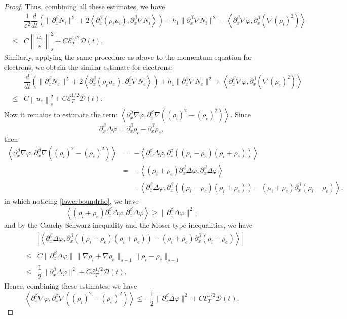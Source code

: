 \documentclass[reqno,twoside,12pt,a4paper]{amsart}
\newcommand{\eps}{\mathbb{\varepsilon}}
\newcommand{\pa}{\partial}
\newcommand{\D}{\nabla}
\newcommand{\vp}{\varphi}
\newcommand{\cubic}{C\mathscr{E}_T^{1/2}\mathscr{D}(t)}
\numberwithin{equation}{section}
\begin{document}
\begin{proof}
Thus, combining all these estimates, we have
\begin{eqnarray}\label{idiss}
&\,& \dfrac{1}{\eps^2}\dfrac{d}{dt}\left( \|\pa_x^\beta N_i\|^2+2\left<\pa_x^\beta (\rho_i u_i), \pa_x^\beta \nabla N_i \right>\right)+ h_1\|\pa_x^\beta\nabla N_i\|^2-\left<\pa_x^\beta \D\vp, \pa_x^\beta(\nabla (\rho_i)^2)\right>\nonumber\\
&\leq& C\left\|\dfrac{u_i}{\eps}\right\|_s^2+\cubic.
\end{eqnarray}
Similarly, applying the same procedure as above to the momentum equation for electrons, we obtain the similar estimate for electrons:
\begin{eqnarray}\label{ediss}
&\,& \dfrac{d}{dt}\left( \|\pa_x^\beta N_e\|^2+2\left<\pa_x^\beta (\rho_e u_e), \pa_x^\beta \nabla N_e \right>\right)+ h_1\|\pa_x^\beta\nabla N_e\|^2+\left<\pa_x^\beta \D\vp, \pa_x^\beta(\nabla (\rho_e)^2)\right>\nonumber\\
&\leq& C\left\|{u}_e\right\|_s^2+C\mathscr{E}_T^{1/2}\mathscr{D}(t).
\end{eqnarray}
Now it remains to estimate the term $\left<\pa_x^\beta \D\vp, \pa_x^\beta \nabla ((\rho_i)^2-(\rho_e)^2)\right>$. Since
\[
\pa_x^\beta \Delta \vp= \pa_x^\beta \rho_i-\pa_x^\beta \rho_e,
\]
then
\begin{eqnarray*}
\left<\pa_x^\beta \D\vp, \pa_x^\beta \nabla ((\rho_i)^2-(\rho_e)^2)\right>
&=&-\left<\pa_x^\beta \Delta \vp, \pa_x^\beta ((\rho_i-\rho_e)(\rho_i+\rho_e))\right>\nonumber\\
&=&-\left<(\rho_i+\rho_e)\pa_x^\beta \Delta \vp, \pa_x^\beta \Delta \vp\right>\nonumber\\
&\,&-\left<\pa_x^\beta \Delta \vp, \pa_x^\beta ((\rho_i-\rho_e)(\rho_i+\rho_e))-(\rho_i+\rho_e)\pa_x^\beta(\rho_i-\rho_e)\right>,
\end{eqnarray*}
in which noticing \eqref{lowerboundrho}, we have
\[
\left<(\rho_i+\rho_e)\pa_x^\beta \Delta \vp, \pa_x^\beta \Delta \vp\right>\geq \|\pa_x^\beta \Delta \vp \|^2,
\]
and by the Cauchy-Schwarz inequality and the Moser-type inequalities, we have
\begin{eqnarray*}
&\,&|\left<\pa_x^\beta \Delta \vp, \pa_x^\beta ((\rho_i-\rho_e)(\rho_i+\rho_e))-(\rho_i+\rho_e)\pa_x^\beta(\rho_i-\rho_e)\right>|\nonumber\\
&\leq& C\|\pa_x^\beta \Delta \vp\|\|\nabla \rho_i+\nabla \rho_e\|_{s-1} \|\rho_i-\rho_e\|_{s-1}\nonumber\\
&\leq &\dfrac{1}{2}\|\pa_x^\beta \Delta \vp\|^2+\cubic.
\end{eqnarray*}
Hence, combining these estimates, we have
\[
\left<\pa_x^\beta \D\vp, \pa_x^\beta \nabla ((\rho_i)^2-(\rho_e)^2)\right>\leq -\dfrac{1}{2}\|\pa_x^\beta \Delta \vp\|^2+C\mathscr{E}_T^{1/2}\mathscr{D}(t).
\]


\end{proof}
\end{document}
